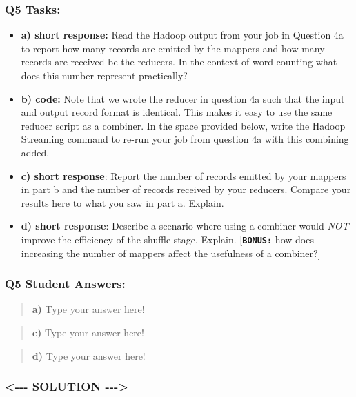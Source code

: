 \documentclass[11pt]{article}
\begin{document}
\subsubsection{Q5 Tasks:}\label{q5-tasks}

\begin{itemize}
\item
  \textbf{a) short response:} Read the Hadoop output from your job in
  Question 4a to report how many records are emitted by the mappers and
  how many records are received be the reducers. In the context of word
  counting what does this number represent practically?
\item
  \textbf{b) code:} Note that we wrote the reducer in question 4a such
  that the input and output record format is identical. This makes it
  easy to use the same reducer script as a combiner. In the space
  provided below, write the Hadoop Streaming command to re-run your job
  from question 4a with this combining added.
\item
  \textbf{c) short response}: Report the number of records emitted by
  your mappers in part b and the number of records received by your
  reducers. Compare your results here to what you saw in part a.
  Explain.
\item
  \textbf{d) short response}: Describe a scenario where using a combiner
  would \emph{NOT} improve the efficiency of the shuffle stage. Explain.
  {[}\textbf{\texttt{BONUS:}} how does increasing the number of mappers
  affect the usefulness of a combiner?{]}
\end{itemize}

    \subsubsection{Q5 Student Answers:}\label{q5-student-answers}

\begin{quote}
\textbf{a)} Type your answer here!
\end{quote}

\begin{quote}
\textbf{c)} Type your answer here!
\end{quote}

\begin{quote}
\textbf{d)} Type your answer here!
\end{quote}

    \subsubsection{\textless{}-\/-\/- SOLUTION
-\/-\/-\textgreater{}}\label{solution----}
\end{document}
